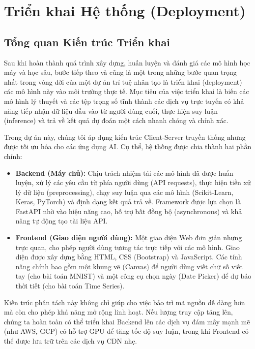 \section{Triển khai Hệ thống (Deployment)}

\subsection{Tổng quan Kiến trúc Triển khai}
Sau khi hoàn thành quá trình xây dựng, huấn luyện và đánh giá các mô hình học máy và học sâu, bước tiếp theo và cũng là một trong những bước quan trọng nhất trong vòng đời của một dự án trí tuệ nhân tạo là triển khai (deployment) các mô hình này vào môi trường thực tế. Mục tiêu của việc triển khai là biến các mô hình lý thuyết và các tệp trọng số tĩnh thành các dịch vụ trực tuyến có khả năng tiếp nhận dữ liệu đầu vào từ người dùng cuối, thực hiện suy luận (inference) và trả về kết quả dự đoán một cách nhanh chóng và chính xác. 

Trong dự án này, chúng tôi áp dụng kiến trúc Client-Server truyền thống nhưng được tối ưu hóa cho các ứng dụng AI. Cụ thể, hệ thống được chia thành hai phần chính:
\begin{itemize}
    \item \textbf{Backend (Máy chủ):} Chịu trách nhiệm tải các mô hình đã được huấn luyện, xử lý các yêu cầu từ phía người dùng (API requests), thực hiện tiền xử lý dữ liệu (preprocessing), chạy suy luận qua các mô hình (Scikit-Learn, Keras, PyTorch) và định dạng kết quả trả về. Framework được lựa chọn là FastAPI nhờ vào hiệu năng cao, hỗ trợ bất đồng bộ (asynchronous) và khả năng tự động tạo tài liệu API.
    \item \textbf{Frontend (Giao diện người dùng):} Một giao diện Web đơn giản nhưng trực quan, cho phép người dùng tương tác trực tiếp với các mô hình. Giao diện được xây dựng bằng HTML, CSS (Bootstrap) và JavaScript. Các tính năng chính bao gồm một khung vẽ (Canvas) để người dùng viết chữ số viết tay (cho bài toán MNIST) và một công cụ chọn ngày (Date Picker) để dự báo thời tiết (cho bài toán Time Series).
\end{itemize}

Kiến trúc phân tách này không chỉ giúp cho việc bảo trì mã nguồn dễ dàng hơn mà còn cho phép khả năng mở rộng linh hoạt. Nếu lượng truy cập tăng lên, chúng ta hoàn toàn có thể triển khai Backend lên các dịch vụ đám mây mạnh mẽ (như AWS, GCP) có hỗ trợ GPU để tăng tốc độ suy luận, trong khi Frontend có thể được lưu trữ trên các dịch vụ CDN nhẹ.

